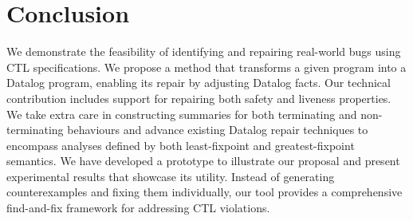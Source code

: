 \section{Conclusion}
\label{sec:conclusion}


We demonstrate the feasibility of identifying and repairing real-world bugs using CTL specifications. We propose a method that transforms a given program into a Datalog program, enabling its repair by adjusting Datalog facts.
Our technical contribution includes support for repairing both safety and liveness properties. We take extra care in constructing summaries for both terminating and non-terminating behaviours and advance existing Datalog repair techniques to encompass analyses defined by both least-fixpoint and greatest-fixpoint semantics. 
We have developed a prototype to illustrate our proposal and present experimental results that showcase its utility. Instead of generating counterexamples and fixing them individually, our tool provides a comprehensive find-and-fix framework for addressing CTL violations. 
